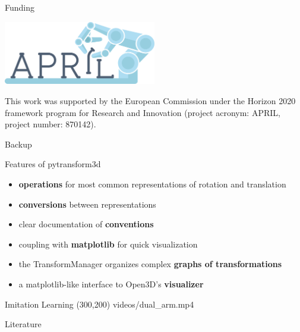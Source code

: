 \documentclass[14pt]{beamer}
\begin{document}
\begin{frame}{Funding}
\begin{center}
\includegraphics[width=0.5\textwidth]{images/logo_april}
\end{center}
This work was supported by the European Commission under the Horizon 2020
framework program for Research and Innovation (project acronym: APRIL, project
number: 870142).
\end{frame}

\begin{frame}
\begin{center}
\Large
Backup
\end{center}
\end{frame}

\begin{frame}{Features of pytransform3d}
\begin{itemize}
\item \textbf{operations} for most common representations of rotation and translation
\item \textbf{conversions} between representations
\item clear documentation of \textbf{conventions}
\item coupling with \textbf{matplotlib} for quick visualization
\item the TransformManager organizes complex \textbf{graphs of transformations}
\item a matplotlib-like interface to Open3D’s \textbf{visualizer}
\end{itemize}
\end{frame}

\begin{frame}[fragile]{Imitation Learning}
\makebox(300,200){
{videos/dual_arm.mp4}}
\end{frame}

\begin{frame}[t,allowframebreaks]{Literature}
\printbibliography[heading=none]
\end{frame}
\end{document}
